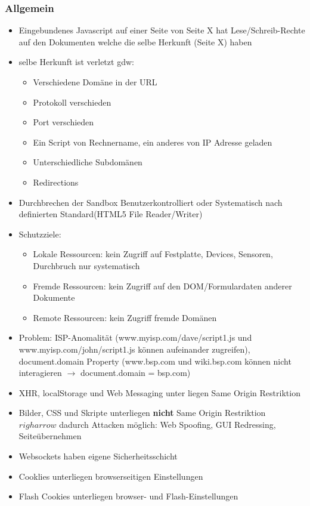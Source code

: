 \documentclass{article} %
\begin{document}
	\subsubsection{Allgemein}
	\begin{itemize}
		\item Eingebundenes Javascript auf einer Seite von Seite X hat Lese/Schreib-Rechte auf den Dokumenten welche die selbe Herkunft (Seite X) haben
		\item selbe Herkunft ist verletzt gdw:
		\begin{itemize}
			\item Verschiedene Domäne in der URL
			\item Protokoll verschieden
			\item Port verschieden
			\item Ein Script von Rechnername, ein anderes von IP Adresse geladen
			\item Unterschiedliche Subdomänen
			\item Redirections
		\end{itemize}
		\item Durchbrechen der Sandbox Benutzerkontrolliert oder Systematisch nach definierten Standard(HTML5 File Reader/Writer)
		\item Schutzziele:
		\begin{itemize}
			\item Lokale Ressourcen: kein Zugriff auf Festplatte, Devices, Sensoren, Durchbruch nur systematisch
			\item Fremde Ressourcen: kein Zugriff auf den DOM/Formulardaten anderer Dokumente
			\item Remote Ressourcen: kein Zugriff fremde Domänen
		\end{itemize}
		\item Problem: ISP-Anomalität (www.myisp.com/dave/script1.js und www.myisp.com/john/script1.js können aufeinander zugreifen), document.domain Property (www.bsp.com und wiki.bsp.com können nicht interagieren $\rightarrow$ document.domain = \glqq bsp.com\grqq)
		\item XHR, localStorage und Web Messaging unter liegen Same Origin Restriktion
		\item Bilder, CSS und Skripte unterliegen \textbf{nicht} Same Origin Restriktion $righarrow$ dadurch Attacken möglich: Web Spoofing, GUI Redressing, Seiteübernehmen
		\item Websockets haben eigene Sicherheitsschicht
		\item Cooklies unterliegen browserseitigen Einstellungen
		\item Flash Cookies unterliegen browser- und Flash-Einstellungen
	\end{itemize}
\end{document}
